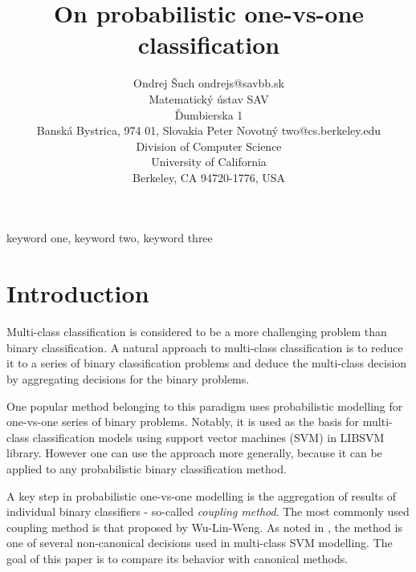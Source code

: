 \documentclass[twoside,11pt]{article}
\begin{document}
\title{On probabilistic one-vs-one classification}

\author{\name Ondrej Šuch \email ondrejs@savbb.sk \\
       \addr Matematický ústav SAV\\
       Ďumbierska 1\\
       Banská Bystrica, 974 01, Slovakia
       \AND
       \name Peter Novotný \email two@cs.berkeley.edu \\
       \addr Division of Computer Science\\
       University of California\\
       Berkeley, CA 94720-1776, USA}


\maketitle

\begin{abstract}%
\blindtext
\end{abstract}

\begin{keywords}
  keyword one, keyword two, keyword three
\end{keywords}

\section{Introduction}


Multi-class classification is considered to be a more challenging problem than binary classification.  A natural approach to multi-class classification is to reduce it to a series of binary classification problems and deduce the multi-class decision by aggregating decisions for the binary problems. 

One popular method belonging to  this paradigm uses probabilistic modelling for one-vs-one series of binary problems. Notably, it is used as the basis for multi-class classification models using support vector machines (SVM) in LIBSVM library. However one can use the approach more generally,  because it can be applied to any probabilistic binary classification method. 

A key step in probabilistic one-vs-one modelling is the aggregation of results of individual binary classifiers - so-called \emph{coupling method}. The most commonly used coupling method is that proposed by Wu-Lin-Weng. As noted in \cite{dohau}, the method is one of several non-canonical decisions used in multi-class SVM modelling. The goal of this paper is to compare its behavior with canonical methods. 
\end{document}
